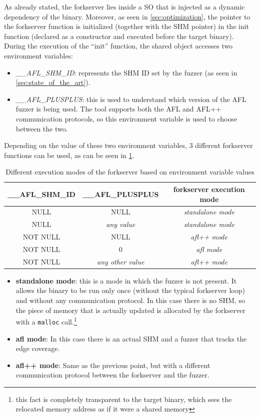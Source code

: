 As already stated, the forkserver lies inside a \gls{SO} that is injected as a dynamic dependency of the binary.
Moreover, as seen in \cref{sec:optimization}, the pointer to the forkserver function is initialized 
(together with the \gls{SHM} pointer) in the init function (declared as a constructor and executed before the target binary).
During the execution of the ``init'' function, the shared object accesses two environment variables:
\begin{itemize}
    \item \textit{\_\_AFL\_SHM\_ID}: represents the \gls{SHM} ID set by the fuzzer (as seen in \cref{sec:state_of_the_art}). 
    \item \textit{\_\_AFL\_PLUSPLUS}: this is used to understand which version of the AFL fuzzer is being used. 
        The tool supports both the AFL and AFL++ communication protocols, so this environment variable is used to choose between the two.
\end{itemize}
Depending on the value of these two environment variables, 3 different forkserver functions can be used, 
as can be seen in 
\cref{tab:forkserver_modes}.
\begin{table}[ht]
    \centering
    \caption{Different execution modes of the forkserver based on environment variable values}
    \label{tab:forkserver_modes}
    \begin{tabular}{c|c|c}
    \hline
    \textbf{\_\_AFL\_SHM\_ID} & \textbf{\_\_AFL\_PLUSPLUS} & forkserver execution mode\\
    \hline
    NULL & NULL & \textit{standalone mode}\\
    \hline
    NULL & \textit{any value} & \textit{standalone mode}\\
    \hline
    NOT NULL & NULL & \textit{afl++ mode}\\
    \hline
    NOT NULL & 0 & \textit{afl mode}\\
    \hline
    NOT NULL & \textit{any other value} & \textit{afl++ mode}\\
        
    \end{tabular}
\end{table}
\begin{itemize}
    \item \textbf{standalone mode}: this is a mode in which the fuzzer is not present. It allows the binary to be run 
    only once (without the typical forkserver loop) and without any communication protocol. In this case there is no 
    \gls{SHM}, so the piece of memory that is actually updated is allocated by the forkserver with a \texttt{malloc} call.\footnote{
        this fact is completely transparent to the target binary, which sees the relocated memory address as if it were a shared memory
    }
    \item \textbf{afl mode}: In this case there is an actual \gls{SHM} and a fuzzer that tracks the edge coverage.
    \item \textbf{afl++ mode}: Same as the previous point, but with a different communication protocol between the forkserver 
        and the fuzzer.
\end{itemize}

